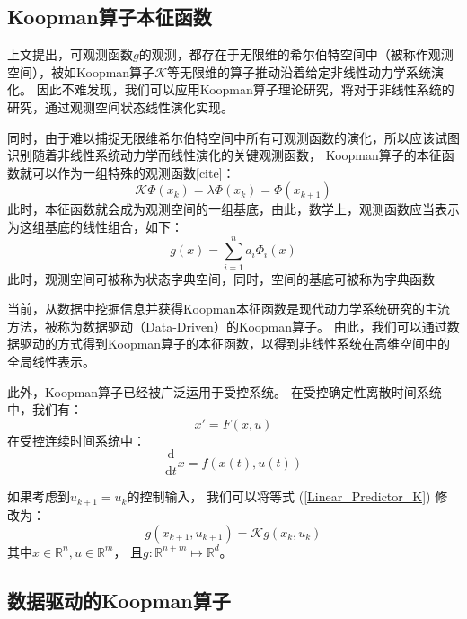 \documentclass[AutoFakeBold]{LZUThesis}
\begin{document}

\subsection{Koopman算子本征函数}
上文提出，可观测函数$g$的观测，都存在于无限维的希尔伯特空间中（被称作观测空间），被如Koopman算子$\mathcal{K}$等无限维的算子推动沿着给定非线性动力学系统演化。
因此不难发现，我们可以应用Koopman算子理论研究，将对于非线性系统的研究，通过观测空间状态线性演化实现。

同时，由于难以捕捉无限维希尔伯特空间中所有可观测函数的演化，所以应该试图识别随着非线性系统动力学而线性演化的关键观测函数，
Koopman算子的本征函数就可以作为一组特殊的观测函数[cite]：
\begin{equation}
  \mathcal{K} \Phi (x_k) = \lambda \Phi(x_k) = \Phi(x_{k + 1})
\end{equation}
此时，本征函数就会成为观测空间的一组基底，由此，数学上，观测函数应当表示为这组基底的线性组合，如下：
\begin{equation}
  g(x) = \sum_{i = 1}^n a_i \Phi_i(x)
\end{equation}
此时，观测空间可被称为状态字典空间，同时，空间的基底可被称为字典函数

当前，从数据中挖掘信息并获得Koopman本征函数是现代动力学系统研究的主流方法，被称为数据驱动（Data-Driven）的Koopman算子。
由此，我们可以通过数据驱动的方式得到Koopman算子的本征函数，以得到非线性系统在高维空间中的全局线性表示。

此外，Koopman算子已经被广泛运用于受控系统。
在受控确定性离散时间系统中，我们有：
\begin{equation}
  x' = F(x, u)
\end{equation}
在受控连续时间系统中：
\begin{equation}
  \frac{\mathrm{d}}{\mathrm{d}t} x = f(x(t), u(t))
\end{equation}

如果考虑到$u_{k + 1} = u_k$的控制输入，
我们可以将等式 (\ref{Linear_Predictor_K}) 修改为：
\begin{equation}
  g(x_{k + 1}, u_{k + 1}) = \mathcal{K} g(x_k, u_k)
  \label{Linear_Predictor_with_Control}
\end{equation}
其中$x \in \mathbb{R}^n, u \in \mathbb{R}^m$，
且$g : \mathbb{R}^{n + m} \mapsto \mathbb{R}^d$。


\subsection{数据驱动的Koopman算子}
\end{document}
